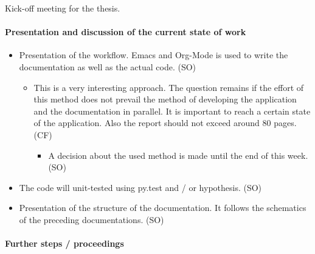 \documentclass[10pt, openright, notitlepage]{scrreprt}
\begin{document}
Kick-off meeting for the thesis.

\paragraph{Presentation and discussion of the current state of work}
\label{sec:org08cff3d}

\begin{itemize}
\item Presentation of the workflow. Emacs and Org-Mode is used to write the
documentation as well as the actual code. (SO)
\begin{itemize}
\item This is a very interesting approach. The question remains if the effort of
this method does not prevail the method of developing the application and
the documentation in parallel. It is important to reach a certain state of
the application. Also the report should not exceed around 80 pages. (CF)
\begin{itemize}
\item A decision about the used method is made until the end of this week. (SO)
\end{itemize}
\end{itemize}
\item The code will unit-tested using py.test and / or hypothesis. (SO)
\item Presentation of the structure of the documentation. It follows the schematics
of the preceding documentations. (SO)
\end{itemize}

\paragraph{Further steps / proceedings}
\label{sec:org738d997}
\end{document}
